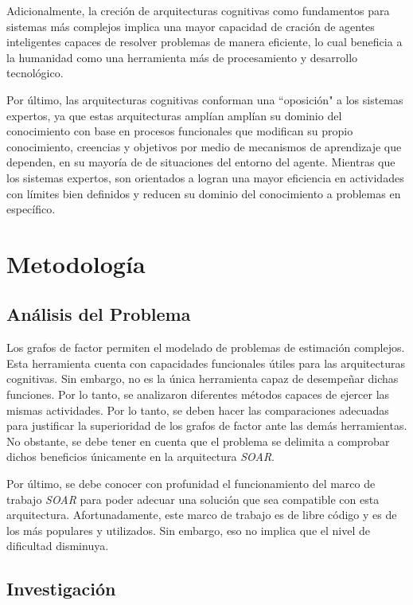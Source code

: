  Adicionalmente, la creci\'{o}n de arquitecturas cognitivas como fundamentos para sistemas m\'{a}s complejos implica una mayor capacidad de craci\'{o}n de agentes inteligentes capaces de resolver problemas de manera eficiente, lo cual beneficia a la humanidad como una herramienta m\'{a}s de procesamiento y desarrollo tecnol\'{o}gico.
 
 Por \'{u}ltimo, las arquitecturas cognitivas conforman una “oposici\'{o}n" a los sistemas expertos, ya que estas arquitecturas ampl\'{i}an ampl\'{i}an su dominio del conocimiento con base en procesos funcionales que modifican su propio conocimiento, creencias y objetivos por medio de mecanismos de aprendizaje que dependen, en su mayor\'{i}a de de situaciones del entorno del agente. Mientras que los sistemas expertos, son orientados a logran una mayor eficiencia en actividades con l\'{i}mites bien definidos y reducen su dominio del conocimiento a problemas en espec\'{i}fico.
 
 \section{Metodolog\'{i}a}
 \subsection{An\'{a}lisis del Problema}
 
Los grafos de factor permiten el modelado de problemas de estimaci\'{o}n complejos. Esta herramienta cuenta con capacidades funcionales \'{u}tiles para las arquitecturas cognitivas. Sin embargo, no es la \'{u}nica herramienta capaz de desempe\~nar dichas funciones. Por lo tanto, se analizaron diferentes m\'{e}todos capaces de ejercer las mismas actividades. Por lo tanto, se deben hacer las comparaciones adecuadas para justificar la superioridad de los grafos de factor ante las dem\'{a}s herramientas. No obstante, se debe tener en cuenta que el problema se delimita a comprobar dichos beneficios \'{u}nicamente en la arquitectura \emph{SOAR}.

Por \'{u}ltimo, se debe conocer con profunidad el funcionamiento del marco de trabajo \emph{SOAR} para poder adecuar una soluci\'{o}n que sea compatible con esta arquitectura. Afortunadamente, este marco de trabajo es de libre c\'{o}digo y es de los m\'{a}s populares y utilizados. Sin embargo, eso no implica que el nivel de dificultad disminuya.
 
 
 \subsection{Investigaci\'{o}n}
 
